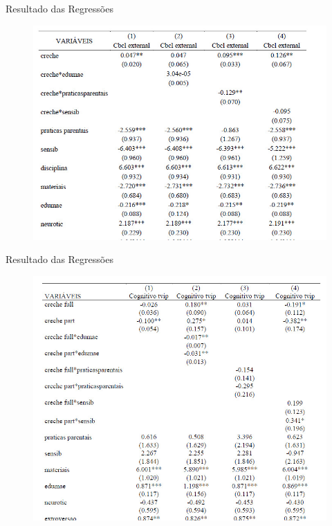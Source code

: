 \documentclass[10pt]{Beamer}
\begin{document}
\begin{frame}{Resultado das Regressões}
	
\begin{figure}[h]
\centering
\includegraphics[width=1.0\textwidth]{Tab4}
\end{figure}
	
\end{frame}

\begin{frame}{Resultado das Regressões}
	
\begin{figure}[h]
\centering
\includegraphics[width=1.0\textwidth]{Tab5}
\end{figure}
	
\end{frame}
\end{document}
